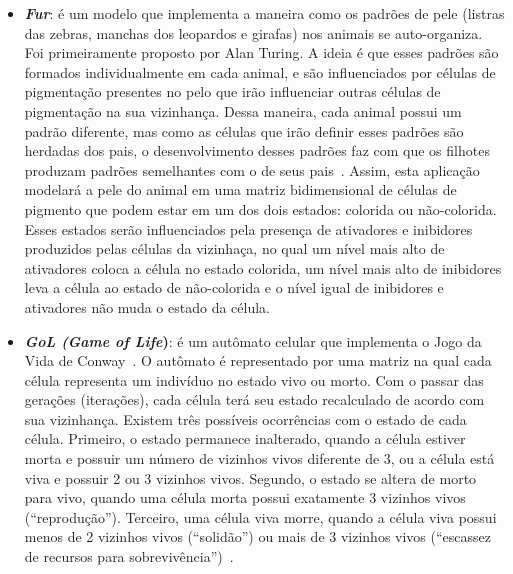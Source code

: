 \begin{itemize}
  \item \textbf{\textit{Fur}}: é um modelo que implementa a maneira como os padrões de pele (listras das zebras, manchas dos leopardos e girafas) nos animais se auto-organiza. Foi primeiramente proposto por Alan Turing. A ideia é que esses padrões são formados individualmente em cada animal, e são influenciados por células de pigmentação presentes no pelo que irão influenciar outras células de pigmentação na sua vizinhança. Dessa maneira, cada animal possui um padrão diferente, mas como as células que irão definir esses padrões são herdadas dos pais, o desenvolvimento desses padrões faz com que os filhotes produzam padrões semelhantes com o de seus pais~\cite{NetLogoFur}. Assim, esta aplicação modelará a pele do animal em uma matriz bidimensional de células de pigmento que podem estar em um dos dois estados: colorida ou não-colorida. Esses estados serão influenciados pela presença de ativadores e inibidores produzidos pelas células da vizinhaça, no qual um nível mais alto de ativadores coloca a célula no estado colorida, um nível mais alto de inibidores leva a célula ao estado de não-colorida e o nível igual de inibidores e ativadores não muda o estado da célula.

  \item \textbf{\textit{GoL (Game of Life})}: é um autômato celular que implementa o Jogo da Vida de Conway~\cite{gardner70}. O autômato é representado por uma matriz na qual cada célula representa um indivíduo no estado vivo ou morto. Com o passar das gerações (iterações), cada célula terá seu estado recalculado de acordo com sua vizinhança. Existem três possíveis ocorrências com o estado de cada célula. Primeiro, o estado permanece inalterado, quando a célula estiver morta e possuir um número de vizinhos vivos diferente de 3, ou a célula está viva e possuir 2 ou 3 vizinhos vivos. Segundo, o estado se altera de morto para vivo, quando uma célula morta possui exatamente 3 vizinhos vivos (``reprodução''). Terceiro, uma célula viva morre, quando a célula viva possui menos de 2 vizinhos vivos (``solidão'') ou mais de 3 vizinhos vivos (``escassez de recursos para sobrevivência'')~\cite{CPE:CPE3479}. 
  

\end{itemize}
